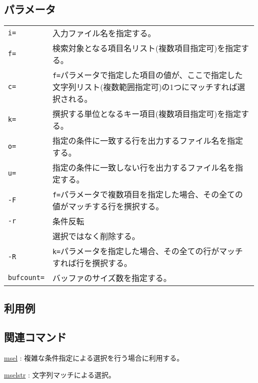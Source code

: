 \subsection*{パラメータ}
\begin{tabular}{ll}
\verb|i=|    & 入力ファイル名を指定する。\\
\verb|f=|    & 検索対象となる項目名リスト(複数項目指定可)を指定する。\\
\verb|c=|    & \verb|f=|パラメータで指定した項目の値が、ここで指定した文字列リスト(複数範囲指定可)の1つにマッチすれば選択される。 \\
\verb|k=|    & 撰択する単位となるキー項目(複数項目指定可)を指定する。\\
\verb|o=|    & 指定の条件に一致する行を出力するファイル名を指定する。 \\
\verb|u=|    & 指定の条件に一致しない行を出力するファイル名を指定する。\\
\verb|-F|    & \verb|f=|パラメータで複数項目を指定した場合、その全ての値がマッチする行を撰択する。\\
\verb|-r|    & 条件反転\\
             & 選択ではなく削除する。\\
\verb|-R|    & \verb|k=|パラメータを指定した場合、その全ての行がマッチすれば行を撰択する。\\
\verb|bufcount=| & バッファのサイズ数を指定する。 \\
\end{tabular} 

\subsection*{利用例}

\subsection*{関連コマンド}
\hyperref[sect:msel]{msel} : 複雑な条件指定による選択を行う場合に利用する。

\hyperref[sect:mselstr]{mselstr} : 文字列マッチによる選択。

%
